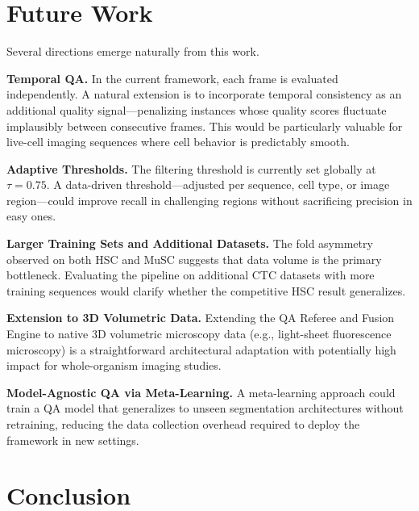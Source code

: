 
\section{Future Work} %
\label{sec:future_work}

Several directions emerge naturally from this work.

\textbf{Temporal QA.} In the current framework, each frame is evaluated independently. A natural
extension is to incorporate temporal consistency as an additional quality signal—penalizing
instances whose quality scores fluctuate implausibly between consecutive frames. This would be
particularly valuable for live-cell imaging sequences where cell behavior is predictably smooth.

\textbf{Adaptive Thresholds.} The filtering threshold is currently set globally at $\tau = 0.75$. A
data-driven threshold—adjusted per sequence, cell type, or image region—could improve recall in
challenging regions without sacrificing precision in easy ones.

\textbf{Larger Training Sets and Additional Datasets.} The fold asymmetry observed on both HSC and
MuSC suggests that data volume is the primary bottleneck. Evaluating the pipeline on additional CTC
datasets with more training sequences would clarify whether the competitive HSC result generalizes.

\textbf{Extension to 3D Volumetric Data.} Extending the QA Referee and Fusion Engine to native 3D
volumetric microscopy data (e.g., light-sheet fluorescence microscopy) is a straightforward
architectural adaptation with potentially high impact for whole-organism imaging studies.

\textbf{Model-Agnostic QA via Meta-Learning.} A meta-learning approach could train a QA model that
generalizes to unseen segmentation architectures without retraining, reducing the data collection
overhead required to deploy the framework in new settings.


\section{Conclusion} %
\label{sec:conclusion}

